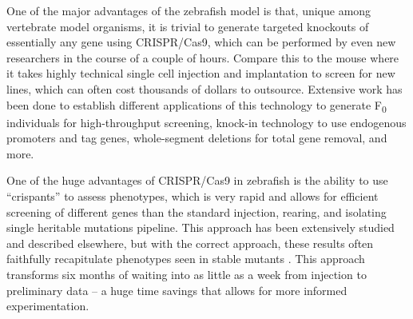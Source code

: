 One of the major advantages of the zebrafish model is that, unique among vertebrate model organisms, it is trivial to generate targeted knockouts of essentially any gene using CRISPR/Cas9, which can be performed by even new researchers in the course of a couple of hours. Compare this to the mouse where it takes highly technical single cell injection and implantation to screen for new lines, which can often cost thousands of dollars to outsource. Extensive work has been done to establish different applications of this technology to generate F\textsubscript{0} individuals for high\hyp{}throughput screening, knock\hyp{}in technology to use endogenous promoters and tag genes, whole\hyp{}segment deletions for total gene removal, and more. 

One of the huge advantages of CRISPR/Cas9 in zebrafish is the ability to use ``crispants'' to assess phenotypes, which is very rapid and allows for efficient screening of different genes than the standard injection, rearing, and isolating single heritable mutations pipeline. This approach has been extensively studied and described elsewhere, but with the correct approach, these results often faithfully recapitulate phenotypes seen in stable mutants \citep{Zhang2017, Wu2018}. This approach transforms six months of waiting into as little as a week from injection to preliminary data -- a huge time savings that allows for more informed experimentation.

